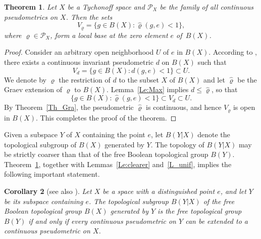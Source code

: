 \documentclass[a4paper,12pt]{amsart}
\def\sub{\subset}
\let\mathcal\mathscr
\newtheorem{theorem}{Theorem}[section]
\newtheorem{corollary}[theorem]{Corollary}
\theoremstyle{definition}
\begin{document}
\begin{theorem}\label{Th_Ab_desc}
Let $X$ be a Tychonoff space and $\mathcal{P}_X$ be the family 
of all continuous pseudometrics on $X$. Then the sets
\[
V_\varrho=\{g\in B(X): \widehat\varrho(g,e)<1\}, 
\]
where $\varrho\in\mathcal{P}_X$, form a local base at
the zero element $e$ of~$B(X)$.
\end{theorem}

\begin{proof}
Consider an arbitrary open neighborhood $U$ of $e$ in $B(X)$. 
According to \cite[Theorem~8.2]{HR}, there exists a continuous 
invariant pseudometric $d$ on $B(X)$ such that 
$$
V_d=\{g\in B(X): d(g,e)<1\}\sub U.
$$
We denote by $\varrho$ the restriction of $d$ to the subset $X$
of $B(X)$ and let $\widehat{\varrho}$ be the Graev extension
of $\varrho$ to $B(X)$. Lemma~\ref{Le:Max} implies 
$d\leq \widehat{\varrho}$, so that 
$$
\{g\in B(X): \widehat{\varrho}(g,e)<1\}\sub V_d\sub U.
$$
By Theorem~\ref{Th_Gra}, the pseudometric $\widehat{\varrho}$
is continuous, and hence $V_\varrho$ is open in $B(X)$. This completes the 
proof of the theorem. 
\end{proof}

Given a subspace $Y$ of $X$ containing the point $e$, let $B(Y|X)$ denote the 
topological subgroup of $B(X)$ generated by $Y$. The topology of $B(Y|X)$ may 
be strictly coarser than that of the free Boolean topological group $B(Y)$. 
Theorem~\ref{Th_Ab_desc}, together with Lemmas~\ref{Le:clearer} and~\ref{L_unif}, 
implies the following important statement. 

\begin{corollary}[{see also \cite[Theorem~4]{Sip}}]
Let $X$ be a space with a distinguished point $e$, and let $Y$ be its subspace 
containing $e$. The topological subgroup $B(Y|X)$ of the free Boolean 
topological group $B(X)$ generated by $Y$ is the free topological group $B(Y)$ 
if and only if every continuous pseudometric on $Y$ can be extended to 
a continuous pseudometric on $X$. 
\end{corollary}
\end{document}

